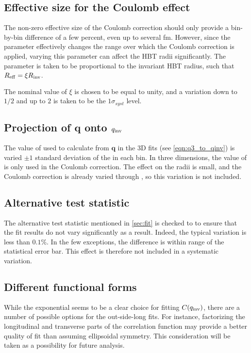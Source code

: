 \subsection{Effective size for the Coulomb effect}
The non-zero effective size of the Coulomb correction \Reff should only provide a bin-by-bin difference of a few percent, even up to several fm.
However, since the parameter effectively changes the \qinv range over which the Coulomb correction is applied, varying this parameter can affect the HBT radii significantly.
The parameter \Reff is taken to be proportional to the invariant HBT radius, such that $R_{\mathrm{eff}} = \xi R_{\mathrm{inv}}$.

The nominal value of $\xi$ is chosen to be equal to unity, and a variation down to $1/2$ and up to $2$ is taken to be the $1\sigma_{syst}$ level.

\subsection{Projection of $\mathbf{q}$ onto $q_{\mathrm{inv}}$}
The value of \kt used to calculate \qinv from $\mathbf{q}$ in the 3D fits (see \cref{eqn:q3_to_qinv}) is varied $\pm 1$ standard deviation of the \kt in each bin.
In three dimensions, the value of \qinv is only used in the Coulomb correction.
The effect on the radii is small, and the Coulomb correction is already varied through \Reff, so this variation is not included.


\subsection{Alternative test statistic}
The alternative test statistic mentioned in \cref{sec:fit} is checked to to ensure that the fit results do not vary significantly as a result.
Indeed, the typical variation is less than $0.1\%$.
In the few exceptions, the difference is within range of the statistical error bar.
This effect is therefore not included in a systematic variation.

\subsection{Different functional forms}
While the exponential seems to be a clear choice for fitting $C(q_{\mathrm{inv}})$, there are a number of possible options for the out-side-long fits.
For instance, factorizing the longitudinal and transverse parts of the correlation function may provide a better quality of fit than assuming ellipsoidal symmetry.
This consideration will be taken as a possibility for future analysis.

